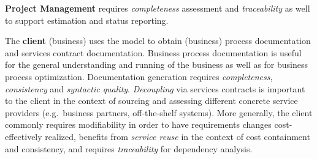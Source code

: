 {\bf Project Management} requires \emph{completeness} assessment and \emph{traceability} as well to support estimation and status reporting.

The {\bf client} (business) uses the model to obtain (business) process documentation and services contract documentation. Business process documentation is useful for the general understanding and running of the business as well as for business process optimization. Documentation generation requires \emph{completeness}, \emph{consistency} and \emph{syntactic quality}. \emph{Decoupling} via services contracts is important to the client in the context of sourcing and assessing different concrete service providers (e.g.\ business partners, off-the-shelf systems). More generally, the client commonly requires modifiability in order to have requirements changes cost-effectively realized, benefits from \emph{service reuse} in the context of cost containment and consistency, and requires \emph{traceability} for dependency analysis.

